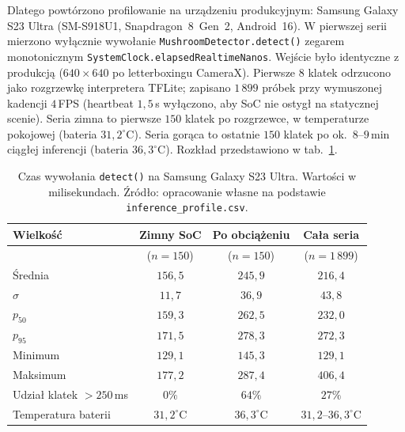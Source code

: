 Dlatego powtórzono profilowanie na urządzeniu produkcyjnym: Samsung Galaxy S23 Ultra (SM-S918U1, Snapdragon~8~Gen~2, Android~16). W pierwszej serii mierzono wyłącznie wywołanie \texttt{MushroomDetector.detect()} zegarem monotonicznym \texttt{SystemClock.elapsedRealtimeNanos}. Wejście było identyczne z produkcją ($640\times640$ po letterboxingu CameraX). Pierwsze $8$ klatek odrzucono jako rozgrzewkę interpretera TFLite; zapisano $1\,899$ próbek przy wymuszonej kadencji $4$\,FPS (heartbeat $1{,}5$\,s wyłączono, aby SoC nie ostygł na statycznej scenie). Seria zimna to pierwsze $150$ klatek po rozgrzewce, w temperaturze pokojowej (bateria $31{,}2^{\circ}\mathrm{C}$). Seria gorąca to ostatnie $150$ klatek po ok.\ $8$--$9$\,min ciągłej inferencji (bateria $36{,}3^{\circ}\mathrm{C}$). Rozkład przedstawiono w tab.~\ref{tab:latency_s23}.

\begin{table}[htbp]
 \centering
 \caption{Czas wywołania \texttt{detect()} na Samsung Galaxy S23 Ultra. Wartości w milisekundach. Źródło: opracowanie własne na podstawie \texttt{inference\_profile.csv}.}
 \label{tab:latency_s23}
 \begin{tabular}{|l|c|c|c|}
 \hline
 \textbf{Wielkość} & \textbf{Zimny SoC} & \textbf{Po obciążeniu} & \textbf{Cała seria} \\
 \hline
  & ($n=150$) & ($n=150$) & ($n=1\,899$) \\
 \hline \hline
 Średnia & $156{,}5$ & $245{,}9$ & $216{,}4$ \\
 \hline
 $\sigma$ & $11{,}7$ & $36{,}9$ & $43{,}8$ \\
 \hline
 $p_{50}$ & $159{,}3$ & $262{,}5$ & $232{,}0$ \\
 \hline
 $p_{95}$ & $171{,}5$ & $278{,}3$ & $272{,}3$ \\
 \hline
 Minimum & $129{,}1$ & $145{,}3$ & $129{,}1$ \\
 \hline
 Maksimum & $177{,}2$ & $287{,}4$ & $406{,}4$ \\
 \hline
 Udział klatek $>250$\,ms & $0\%$ & $64\%$ & $27\%$ \\
 \hline
 Temperatura baterii & $31{,}2^{\circ}\mathrm{C}$ & $36{,}3^{\circ}\mathrm{C}$ & $31{,}2$--$36{,}3^{\circ}\mathrm{C}$ \\
 \hline
 \end{tabular}
\end{table}

